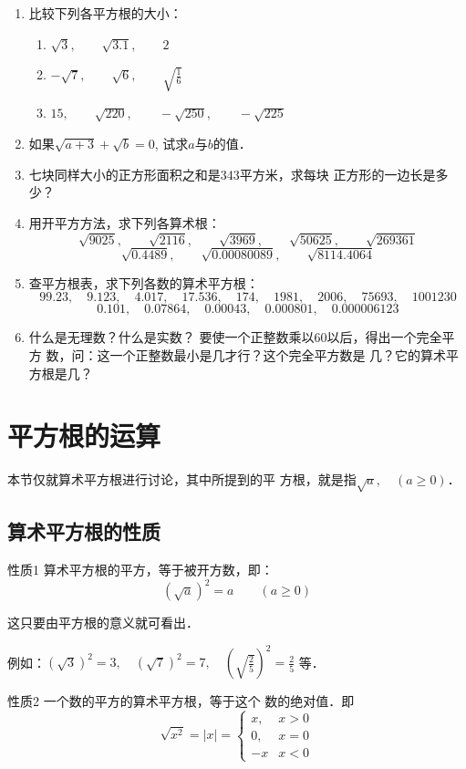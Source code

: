 \begin{enumerate}
\item 比较下列各平方根的大小：
\begin{enumerate}
    \item $\sqrt{3},\qquad \sqrt{3.1},\qquad 2$
    \item $-\sqrt{7},\qquad \sqrt{6},\qquad \sqrt{\frac{1}{6}}$
    \item $15,\qquad \sqrt{220},\qquad -\sqrt{250},\qquad -\sqrt{225}$
\end{enumerate}

\item 如果$\sqrt{a+3}+\sqrt{b}=0$, 试求$a$与$b$的值．
\item 七块同样大小的正方形面积之和是343平方米，求每块
正方形的一边长是多少？
\item 用开平方方法，求下列各算术根：
\[\sqrt{9025},\qquad \sqrt{2116},\qquad \sqrt{3969},\qquad \sqrt{50625},\qquad \sqrt{269361}\]
\[\sqrt{0.4489},\qquad \sqrt{0.00080089},\qquad \sqrt{8114.4064}\]
\item 查平方根表，求下列各数的算术平方根：
\[99.23,\quad 9.123,\quad 4.017,\quad 17.536,\quad 174,\quad 1981,\quad 2006,\quad 
75693,\quad 1001230\]
\[0.101,\quad 0.07864,\quad 0.00043,\quad 0.000801,\quad 
0.000006123\]
\item 什么是无理数？什么是实数？
\staritem 要使一个正整数乘以60以后，得出一个完全平方
数，问：这一个正整数最小是几才行？这个完全平方数是
几？它的算术平方根是几？
\end{enumerate}

\section{平方根的运算}
本节仅就算术平方根进行讨论，其中所提到的平
方根，就是指$\sqrt{a},\quad (a\ge 0)$．

\subsection{算术平方根的性质}

\begin{blk}{性质1}
    算术平方根的平方，等于被开方数，即：
$$\left(\sqrt{a}\right)^2=a\qquad (a\ge 0)$$
\end{blk}

这只要由平方根的意义就可看出．

例如：$(\sqrt{3})^2=3,\quad (\sqrt{7})^2=7,\quad \left(\sqrt{\frac{2}{5}}\right)^2=\frac{2}{5}$
等．

\begin{blk}{性质2}
    一个数的平方的算术平方根，等于这个
数的绝对值．即
\[\sqrt{x^2}=|x|=\begin{cases}
    x,& x>0\\
    0, &x=0\\
    -x & x<0
\end{cases}\]
\end{blk}

